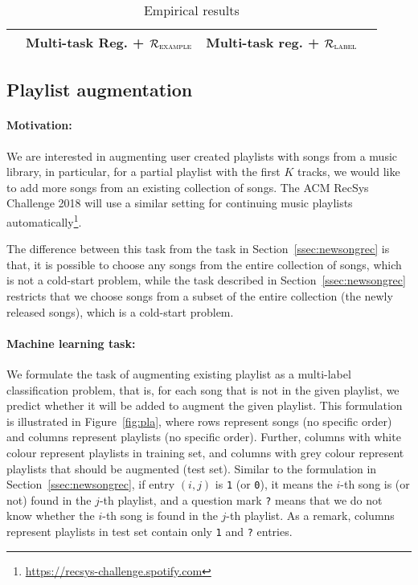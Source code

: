\begin{table}[!h]
\centering
\caption{Empirical results}
\begin{tabular}{l|ccc}
\toprule
{}            & Multi-task Reg. + $\mathcal{R}_\textsc{example}$ & Multi-task reg. + $\mathcal{R}_\textsc{label}$ \\
\midrule
\bottomrule
\end{tabular}
\end{table}



\subsection{Playlist augmentation}
\label{ssec:pla}

\paragraph{Motivation:}
We are interested in augmenting user created playlists with songs from a music library,
in particular, for a partial playlist with the first $K$ tracks, 
we would like to add more songs from an existing collection of songs.
The ACM RecSys Challenge 2018 will use a similar setting for continuing music playlists 
automatically\footnote{\url{https://recsys-challenge.spotify.com}}.

The difference between this task from the task in Section~\ref{ssec:newsongrec} is that,
it is possible to choose any songs from the entire collection of songs, which is not a cold-start problem,
while the task described in Section~\ref{ssec:newsongrec} restricts that 
we choose songs from a subset of the entire collection (the newly released songs), 
which is a cold-start problem.

\paragraph{Machine learning task:}
We formulate the task of augmenting existing playlist as a multi-label classification problem,
that is, for each song that is not in the given playlist, 
we predict whether it will be added to augment the given playlist.
This formulation is illustrated in Figure~\ref{fig:pla},
where rows represent songs (no specific order) and columns represent playlists (no specific order).
Further, columns with white colour represent playlists in training set, 
and columns with grey colour represent playlists that should be augmented (\ie test set).
Similar to the formulation in Section~\ref{ssec:newsongrec}, if entry $(i, j)$ is \texttt{1} (or \texttt{0}), 
it means the $i$-th song is (or not) found in the $j$-th playlist, 
and a question mark \texttt{?} means that we do not know whether the $i$-th song is found in the $j$-th playlist.
As a remark, columns represent playlists in test set contain only \texttt{1} and \texttt{?} entries.

